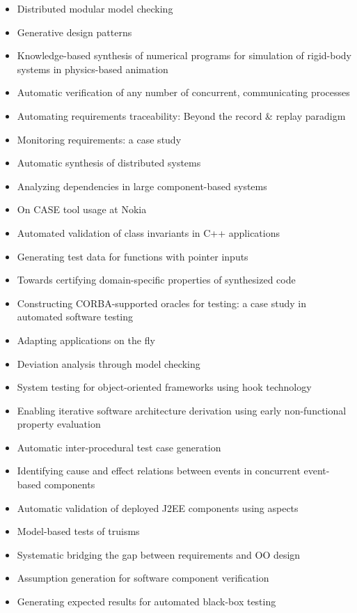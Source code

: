 {\begin{itemize}[itemsep=-1ex]
  \item Distributed modular model checking
  \item Generative design patterns
  \item Knowledge-based synthesis of numerical programs for simulation of rigid-body systems in physics-based animation
  \item Automatic verification of any number of concurrent, communicating processes
  \item Automating requirements traceability: Beyond the record \& replay paradigm
  \item Monitoring requirements: a case study
  \item Automatic synthesis of distributed systems
  \item Analyzing dependencies in large component-based systems
  \item On CASE tool usage at Nokia
  \item Automated validation of class invariants in C++ applications
  \item Generating test data for functions with pointer inputs
  \item Towards certifying domain-specific properties of synthesized code
  \item Constructing CORBA-supported oracles for testing: a case study in automated software testing
  \item Adapting applications on the fly
  \item Deviation analysis through model checking
  \item System testing for object-oriented frameworks using hook technology
  \item Enabling iterative software architecture derivation using early non-functional property evaluation
  \item Automatic inter-procedural test case generation
  \item Identifying cause and effect relations between events in concurrent event-based components
  \item Automatic validation of deployed J2EE components using aspects
  \item Model-based tests of truisms
  \item Systematic bridging the gap between requirements and OO design
  \item Assumption generation for software component verification
  \item Generating expected results for automated black-box testing 
\end{itemize}
}

